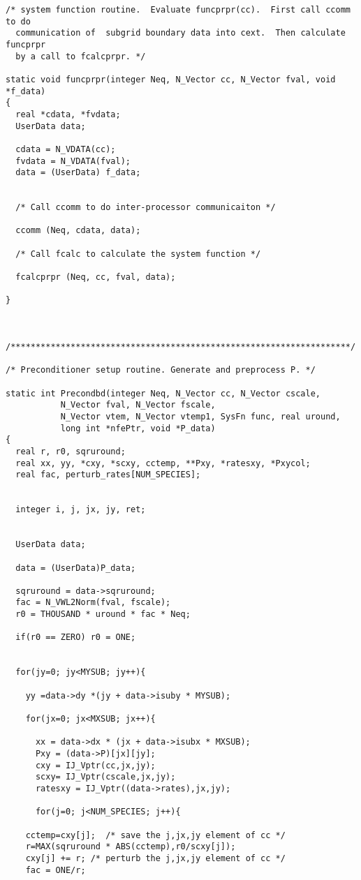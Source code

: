 \documentclass[11pt]{article}
\begin{document}
\begin{verbatim}
/* system function routine.  Evaluate funcprpr(cc).  First call ccomm to do 
  communication of  subgrid boundary data into cext.  Then calculate funcprpr
  by a call to fcalcprpr. */

static void funcprpr(integer Neq, N_Vector cc, N_Vector fval, void *f_data)
{
  real *cdata, *fvdata;
  UserData data;

  cdata = N_VDATA(cc);
  fvdata = N_VDATA(fval);
  data = (UserData) f_data;


  /* Call ccomm to do inter-processor communicaiton */

  ccomm (Neq, cdata, data);

  /* Call fcalc to calculate the system function */

  fcalcprpr (Neq, cc, fval, data);

}



/********************************************************************/

/* Preconditioner setup routine. Generate and preprocess P. */

static int Precondbd(integer Neq, N_Vector cc, N_Vector cscale,
           N_Vector fval, N_Vector fscale,
           N_Vector vtem, N_Vector vtemp1, SysFn func, real uround,
           long int *nfePtr, void *P_data)
{
  real r, r0, sqruround;
  real xx, yy, *cxy, *scxy, cctemp, **Pxy, *ratesxy, *Pxycol;
  real fac, perturb_rates[NUM_SPECIES];


  integer i, j, jx, jy, ret;


  UserData data;

  data = (UserData)P_data;

  sqruround = data->sqruround;
  fac = N_VWL2Norm(fval, fscale);
  r0 = THOUSAND * uround * fac * Neq;

  if(r0 == ZERO) r0 = ONE;


  for(jy=0; jy<MYSUB; jy++){

    yy =data->dy *(jy + data->isuby * MYSUB);

    for(jx=0; jx<MXSUB; jx++){

      xx = data->dx * (jx + data->isubx * MXSUB);
      Pxy = (data->P)[jx][jy];
      cxy = IJ_Vptr(cc,jx,jy);
      scxy= IJ_Vptr(cscale,jx,jy);
      ratesxy = IJ_Vptr((data->rates),jx,jy);

      for(j=0; j<NUM_SPECIES; j++){

    cctemp=cxy[j];  /* save the j,jx,jy element of cc */
    r=MAX(sqruround * ABS(cctemp),r0/scxy[j]);
    cxy[j] += r; /* perturb the j,jx,jy element of cc */
    fac = ONE/r;


\end{verbatim}
\end{document}

